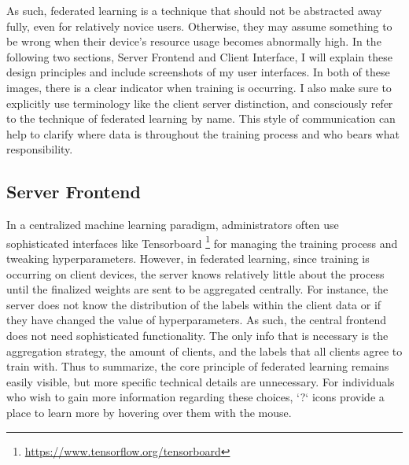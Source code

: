 \documentclass[manuscript,screen,review]{acmart}
\begin{document}
As such, federated learning is a technique that should not be abstracted away fully, even for relatively novice users. Otherwise, they may assume something to be wrong when their device's resource usage becomes abnormally high. In the following two sections, Server Frontend and Client Interface, I will explain these design principles and include screenshots of my user interfaces. In both of these images, there is a clear indicator when training is occurring. I also make sure to explicitly use terminology like the client server distinction, and consciously refer to the technique of federated learning by name. This style of communication can help to clarify where data is throughout the training process and who bears what responsibility.

\subsection*{ Server Frontend}

In a centralized machine learning paradigm, administrators often use sophisticated interfaces like Tensorboard \footnote{\url{https://www.tensorflow.org/tensorboard}} for managing the training process and tweaking hyperparameters. However, in federated learning, since training is occurring on client devices, the server knows relatively little about the process until the finalized weights are sent to be aggregated centrally. For instance, the server does not know the distribution of the labels within the client data or if they have changed the value of hyperparameters. As such, the central frontend does not need sophisticated functionality. The only info that is necessary is the aggregation strategy, the amount of clients, and the labels that all clients agree to train with. Thus to summarize, the core principle of federated learning remains easily visible, but more specific technical details are unnecessary. For individuals who wish to gain more information regarding these choices, `?` icons provide a place to learn more by hovering over them with the mouse.
\end{document}
